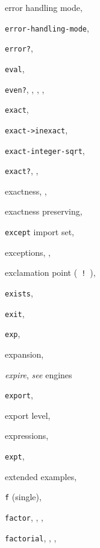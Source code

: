 {\begin{multicols}{2}
error handling mode, \pageref{io_s15}
  
\texttt{error-handling-mode}, \textit{\pageref{io_s25}}
  
\texttt{error?}, \textit{\pageref{exceptions_s22}}
  
\texttt{eval}, \textit{\pageref{control_s80}}
  
\texttt{even?}, \pageref{start_s160}, \pageref{further_s37}, \pageref{further_s82}, \textit{\pageref{objects_s96}}
  
\texttt{exact}, \textit{\pageref{objects_s114}}
  
\texttt{exact-\textgreater{}inexact}, \textit{\pageref{objects_s116}}
  
\texttt{exact-integer-sqrt}, \textit{\pageref{objects_s128}}
  
\texttt{exact?}, \pageref{objects_s73}, \textit{\pageref{objects_s86}}
  
exactness, \pageref{objects_s72}, \pageref{objects_s113}
  
exactness preserving, \pageref{objects_s75}
  
\texttt{except} import set, \pageref{libraries_s10}
  
exceptions, \pageref{intro_s55}, \pageref{exceptions_s0}
  
exclamation point ( \texttt{!} ), \pageref{intro_s51}
  
\texttt{exists}, \textit{\pageref{control_s36}}
  
\texttt{exit}, \textit{\pageref{libraries_s18}}
  
\texttt{exp}, \textit{\pageref{objects_s129}}
  
expansion, \pageref{further_s3}
  
\textit{expire}, \textit{see} engines
  
\texttt{export}, \pageref{libraries_s3}
  
export level, \pageref{libraries_s7}
  
expressions, \pageref{intro_s40}
  
\texttt{expt}, \textit{\pageref{objects_s111}}
  
extended examples, \pageref{examples_s0}
  
\texttt{f} (single), \pageref{objects_s83}
  
\texttt{factor}, \pageref{further_s51}, \pageref{further_s54}, \pageref{further_s60}
  
\texttt{factorial}, \pageref{further_s46}, \pageref{further_s64}, \pageref{control_s27}
  

\end{multicols}}
